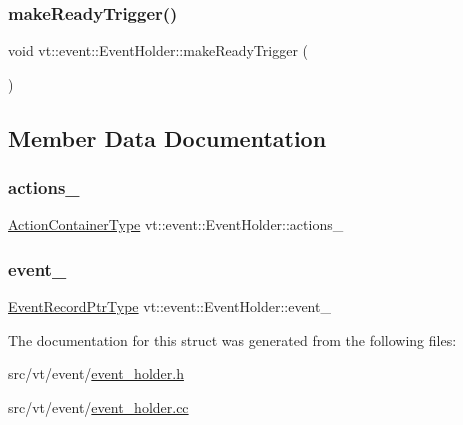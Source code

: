 \mbox{\label{structvt_1_1event_1_1_event_holder_a6a9295755ee849b769c7e5ad1c25ee08}} 
\subsubsection{\texorpdfstring{make\+Ready\+Trigger()}{makeReadyTrigger()}}
{\footnotesize\ttfamily void vt\+::event\+::\+Event\+Holder\+::make\+Ready\+Trigger (\begin{DoxyParamCaption}{ }\end{DoxyParamCaption})}



\subsection{Member Data Documentation}
\mbox{\label{structvt_1_1event_1_1_event_holder_ab2badf41e04556c851639ea432768560}} 
\subsubsection{\texorpdfstring{actions\+\_\+}{actions\_}}
{\footnotesize\ttfamily \hyperlink{structvt_1_1event_1_1_event_holder_ae0e2d5fe3bd5792118116105a0a09db7}{Action\+Container\+Type} vt\+::event\+::\+Event\+Holder\+::actions\+\_\+\hspace{0.3cm}{\ttfamily [private]}}

\mbox{\label{structvt_1_1event_1_1_event_holder_a62cebec55c3a8a4a54423d11504fb4ea}} 
\subsubsection{\texorpdfstring{event\+\_\+}{event\_}}
{\footnotesize\ttfamily \hyperlink{structvt_1_1event_1_1_event_holder_a89949c85549018aad229356105187d50}{Event\+Record\+Ptr\+Type} vt\+::event\+::\+Event\+Holder\+::event\+\_\+\hspace{0.3cm}{\ttfamily [private]}}



The documentation for this struct was generated from the following files\+:\begin{DoxyCompactItemize}
\item 
src/vt/event/\hyperlink{event__holder_8h}{event\+\_\+holder.\+h}\item 
src/vt/event/\hyperlink{event__holder_8cc}{event\+\_\+holder.\+cc}\end{DoxyCompactItemize}
